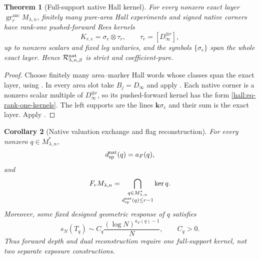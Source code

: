 \documentclass[10pt,reqno]{amsart}
\theoremstyle{plain}
\newtheorem{theorem}{Theorem}[section]
\newtheorem{corollary}[theorem]{Corollary}
\theoremstyle{definition}
\theoremstyle{remark}
\begin{document}
\begin{theorem}[Full-support native Hall kernel]
\label{hall:thm-native-kernel}
For every nonzero exact layer
$\operatorname{gr}^{\mathrm{anc}}_rM_{\lambda,n}$, finitely many pure-area
Hall experiments and signed native corners have rank-one pushed-forward Rees
kernels
\begin{equation}
 K_{r,e}=\sigma_e\otimes\tau_r,
 \qquad
 \tau_r=[D_\infty^{\otimes r}],
 \label{hall:eq-rank-one-kernels}
\end{equation}
up to nonzero scalars and fixed leg unitaries, and the symbols
$\{\sigma_e\}$ span the whole exact layer.  Hence
$\mathcal R_{\lambda,n,\beta}^{\rm nat}$ is strict and coefficient-pure.
\end{theorem}

\begin{proof}
Choose finitely many area--marker Hall words whose classes span the exact
layer, using .  In every area slot take
$B_j=D_\infty$ and apply
.  Each native corner is a
nonzero scalar multiple of $D_\infty^{\otimes r}$, so its pushed-forward
kernel has the form \eqref{hall:eq-rank-one-kernels}.  The left supports are
the lines $\mathbf k\sigma_e$ and their sum is the exact layer.  Apply
.
\end{proof}

\begin{corollary}[Native valuation exchange and flag reconstruction]
\label{hall:cor-native-valuation}
For every nonzero $q\in M_{\lambda,n}^*$,
\begin{equation}
 d_{\rm sp}^{\rm nat}(q)=a_F(q),
 \label{hall:eq-native-depth}
\end{equation}
and
\begin{equation}
 F_rM_{\lambda,n}
 =\bigcap_{\substack{q\in M_{\lambda,n}^*\\
                d_{\rm sp}^{\rm nat}(q)\le r-1}}
 \ker q.
 \label{hall:eq-native-flag}
\end{equation}
Moreover, some fixed designed geometric response of $q$ satisfies
\begin{equation}
 s_N(T_q)
 \sim C_q\frac{(\log N)^{a_F(q)-1}}{N},
 \qquad C_q>0.
 \label{hall:eq-native-exact-law}
\end{equation}
Thus forward depth and dual reconstruction require one full-support kernel,
not two separate exposure constructions.
\end{corollary}
\end{document}
